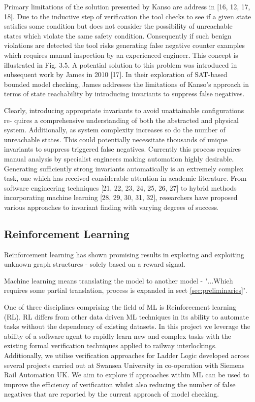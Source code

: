 \documentclass[runningheads]{llncs}
\begin{document}
Primary limitations of the solution presented by Kanso are address in [16, 12, 17, 18].
Due to the inductive step of verification the tool checks to see if a given state satisfies
some condition but does not consider the possibility of unreachable states which violate
the same safety condition. Consequently if such benign violations are detected the tool
risks generating false negative counter examples which requires manual inspection by an
experienced engineer. This concept is illustrated in Fig. 3.5. A potential solution to this
problem was introduced in subsequent work by James in 2010 [17]. In their exploration of
SAT-based bounded model checking, James addresses the limitations of Kanso’s approach
in terms of state reachability by introducing invariants to suppress false negatives.

Clearly, introducing appropriate invariants to avoid unattainable configurations re-
quires a comprehensive understanding of both the abstracted and physical system.
Additionally, as system complexity increases so do the number of unreachable states. This
could potentially necessitate thousands of unique invariants to suppress triggered false
negatives. Currently this process requires manual analysis by specialist engineers making
automation highly desirable. Generating sufficiently strong invariants automatically is
an extremely complex task, one which has received considerable attention in academic
literature. From software engineering techniques [21, 22, 23, 24, 25, 26, 27] to hybrid
methods incorporating machine learning [28, 29, 30, 31, 32], researchers have proposed
various approaches to invariant finding with varying degrees of success. 

\subsection{Reinforcement Learning}
Reinforcement learning has shown promising results in exploring and exploiting unknown graph structures - solely based on a reward signal.

Machine learning means translating the model to another model - "...Which requires some partial translation, process is expanded in sect \ref{sec:preliminaries}".

One of three disciplines comprising the field of ML is Reinforcement learning (RL). RL
differs from other data driven ML techniques in its ability to automate tasks without the
dependency of existing datasets. In this project we leverage the ability of a software agent
to rapidly learn new and complex tasks with the existing formal verification techniques
applied to railway interlockings. Additionally, we utilise verification approaches for
Ladder Logic developed across several projects carried out at Swansea University in
co-operation with Siemens Rail Automation UK. We aim to explore if approaches within
ML can be used to improve the efficiency of verification whilst also reducing the number
of false negatives that are reported by the current approach of model checking.
\end{document}
